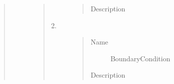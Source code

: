 \documentclass[letterpaper,10pt,english]{sphinxmanual}
\begin{document}
\begin{quote}
\begin{description}
\begin{quote}
\begin{description}
\begin{quote}
\begin{description}
\item[{Description}] \leavevmode
{}

\end{description}\end{quote}

\item[{2.}] \leavevmode\begin{quote}\begin{description}
\item[{Name}] \leavevmode
BoundaryCondition

\item[{Description}] \leavevmode
{}

\end{description}\end{quote}

\end{description}\end{quote}

\end{description}\end{quote}
\end{document}
